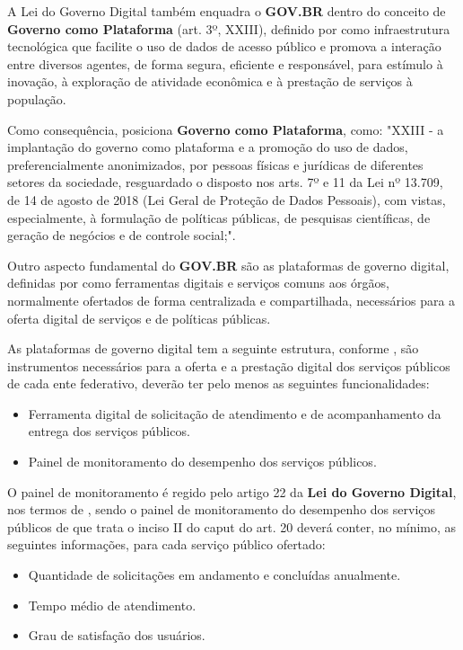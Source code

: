 A Lei do Governo Digital também enquadra o \textbf{GOV.BR} dentro do conceito de \textbf{Governo como Plataforma} (art. 3º, XXIII), definido por \cite{l14129} como infraestrutura tecnológica que facilite o uso de dados de acesso público e promova a interação entre diversos agentes, de forma segura, eficiente e responsável, para estímulo à inovação, à exploração de atividade econômica e à prestação de serviços à população.

Como consequência, \cite{l14129} posiciona \textbf{Governo como Plataforma}, como: "XXIII - a implantação do governo como plataforma e a promoção do uso de dados, preferencialmente anonimizados, por pessoas físicas e jurídicas de diferentes setores da sociedade, resguardado o disposto nos arts. 7º e 11 da Lei nº 13.709, de 14 de agosto de 2018 (Lei Geral de Proteção de Dados Pessoais), com vistas, especialmente, à formulação de políticas públicas, de pesquisas científicas, de geração de negócios e de controle social;".

Outro aspecto fundamental do \textbf{GOV.BR} são as plataformas de governo digital, definidas por \cite{l14129} como ferramentas digitais e serviços comuns aos órgãos, normalmente ofertados de forma centralizada e compartilhada, necessários para a oferta digital de serviços e de políticas públicas. 

As plataformas de governo digital tem a seguinte estrutura, conforme \cite{l14129}, são instrumentos necessários para a oferta e a prestação digital dos serviços públicos de cada ente federativo, deverão ter pelo menos as seguintes funcionalidades: 

\begin{itemize}
    \item Ferramenta digital de solicitação de atendimento e de acompanhamento da entrega dos serviços públicos.
    \item Painel de monitoramento do desempenho dos serviços públicos.
\end{itemize}

O painel de monitoramento é regido pelo artigo 22 da \textbf{Lei do Governo Digital}, nos termos de \cite{l14129}, sendo o painel de monitoramento do desempenho dos serviços públicos de que trata o inciso II do caput do art. 20 deverá conter, no mínimo, as seguintes informações, para cada serviço público ofertado:

\begin{itemize}
    \item Quantidade de solicitações em andamento e concluídas anualmente.
    \item Tempo médio de atendimento.
    \item Grau de satisfação dos usuários.
\end{itemize}

